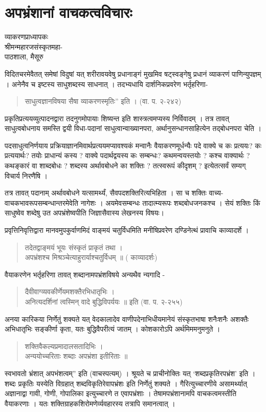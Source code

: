 \chapter{अपभ्रंशानां वाचकत्वविचारः}

\begin{center}
\smallskip

व्याकरणप्राध्यापकः\\
श्रीमन्महारजसंस्कृतमहा-\\
पाठशाला, मैसूरु
\end{center}

विदितचरमेवैतत् समेषां विदुषां यत् शरीरावयवेषु प्रधानाङ्गं मुखमिव षट्स्वङ्गेषु प्रधानं व्याकरणं पाणिन्युपज्ञम् । अनेनैव च इष्टस्य साधुशब्दस्य साधनात् । तदभ्यधायि दार्शनिकप्रवरेण भर्तृहरिणा-
\begin{verse}
साधुत्वज्ञानविषया सैषा व्याकरणस्मृतिः” इति । (वा. प. २-२४२)
\end{verse}
प्रकृतिप्रत्ययव्युत्पादनद्वारा तदनुगमोपायाः शिष्यन्त इति शास्त्रत्वमप्यस्य निर्विवादम् । तत्र तावत् साधुत्वबोधनाय समस्ति द्वयी विधा-पदानां साधुत्वान्वाख्यानपरा, अर्थानुसन्धानसाहित्येन तद्बोधनपरा चेति । 

पदसाधुत्वनिर्णयाय प्रक्रियाज्ञानमिवार्थप्रत्ययमप्यावश्यकं मन्वानैः वैयाकरणमूर्धन्यैः पदे वाक्ये च कः प्रत्ययः? कः प्रत्ययार्थः? तयोः प्राधान्यं कस्य ? वाक्ये पदार्थद्वयस्य कः सम्बन्धः? कथमन्वयस्तयोः ? कश्च वाक्यार्थः ? कथङ्कारं वा शाब्दबोधः ? शब्दस्य अर्थावबोधने का शक्तिः ? तत्स्वरूपं कीदृशम् ? इत्येतत्सर्वं सम्यग् विचार्य निरणैषि ।  

तत्र तावत् पदानाम् अर्थावबोधने यत्सामर्थ्यं, सैवपदशक्तिरित्यभिहिता । सा च शक्तिः वाच्य-वाचकभावरूपसम्बन्धान्तरमेवेति नागेशः । अयमेवसम्बन्धः तादात्म्यरूपः शब्दबोधजनकश्च । सेयं शक्तिः किं साधुष्वेव शब्देषु उत अपभ्रंशेष्वपीति जिज्ञासैवास्य लेखनस्य विषयः।

प्रवृत्तिनिवृत्तिद्वारा मानवमुपकुर्वाणमिदं वाङ्मयं चतुर्विधमिति मनीषिप्रवरेण दण्डिनेत्थं प्रावाचि काव्यादर्शे ।
\begin{verse}
तदेतद्वाङ्मयं भूयः संस्कृतं प्राकृतं तथा ।\\
अपभ्रंशश्च मिश्रञ्चेत्याहुरार्याश्चतुर्विधम् ॥ ( काव्यादर्शः)
\end{verse}
वैयाकरणेन भर्तृहरिणा तावत् शब्दानामपभ्रंशविषये अन्यथैव न्यगादि -
\begin{verse}
दैवीवाग्व्यवकीर्णेयमशक्तैरभिधातृभिः ।\\
अनित्यदर्शिनां त्वस्मिन् वादे बुद्धिविपर्ययः ॥ इति (वा. प. २-२५५)
\end{verse}
अनया कारिकया निर्णेतुं शक्यते यत् वेदकालादेव वाणीपदेनाभिधीयमानेयं संस्कृतभाषा शनैःशनैः अशक्तैः अभिधातृभिः सङ्कीर्णा कृता, यतः बुद्धिवैपरीत्यं जातम् । कोशकारोऽपि अर्थमिममनुमनुते ।
\begin{verse}
शक्तिवैकल्यप्रमादालसतादिभिः ।\\
अन्ययोच्चरिताः शब्दाः अपभ्रंशा इतीरिताः ॥ 
\end{verse}
स्वभावतो भ्रंशात् अपभंशत्वम्” इति (वाचस्पत्यम्) । श्रूयते च प्राचीनोक्तिः यत् ‘शब्दप्रकृतिरपभ्रंश’ इति । शब्दः प्रकृतिः यस्येति विग्रहात् शब्दविकृतिरेवापभ्रंशः इति निर्णेतुं शक्यते । गैरित्युच्चारणीये असामर्थ्यात् अज्ञानाद्वा गावी, गोणी, गोपालिका इत्युच्चारणे त एवापभ्रंशाः । तेषामपभ्रंशानामपि वाचकत्वमस्तीति वैयाकरणाः । यतः शक्तिग्राहकशिरोमणेर्व्यवहारस्य तत्रापि समानत्वात् ।

